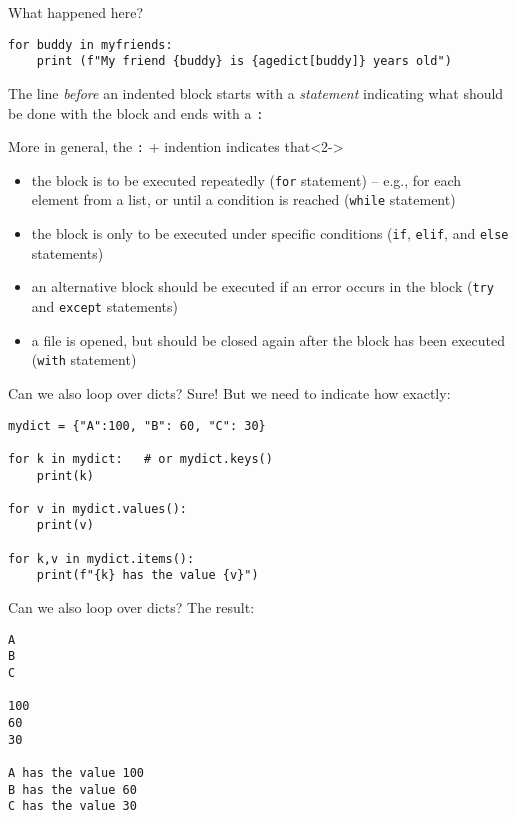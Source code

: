 \documentclass{beamer}
\begin{document}
\begin{frame}[fragile]{What happened here?}
\begin{lstlisting}
for buddy in myfriends:
    print (f"My friend {buddy} is {agedict[buddy]} years old")
\end{lstlisting}
\small
The line \emph{before} an indented block starts with a \emph{statement} indicating what should be done with the block and ends with a \texttt{:}

\footnotesize
\begin{block}{More in general, the \texttt{:} + indention indicates that}<2->
	\begin{itemize}
		\item<3-> the block is to be executed repeatedly (\texttt{for} statement) – e.g., for each element from a list, or until a condition is reached (\texttt{while} statement)
		\item<4-> the block is only to be executed under specific conditions (\texttt{if}, \texttt{elif}, and \texttt{else} statements)
		\item<5-> an alternative block should be executed if an error occurs in the block (\texttt{try} and \texttt{except} statements)
		\item<6-> a file is opened, but should be closed again after the block has been executed (\texttt{with} statement)
	\end{itemize}
\end{block}
\end{frame}



\begin{frame}[fragile]{Can we also loop over dicts?}
Sure! But we need to indicate how exactly:

\begin{lstlisting}
mydict = {"A":100, "B": 60, "C": 30}

for k in mydict:   # or mydict.keys()
    print(k)

for v in mydict.values():
    print(v)

for k,v in mydict.items():
    print(f"{k} has the value {v}")
\end{lstlisting}

\end{frame}




\begin{frame}[fragile]{Can we also loop over dicts?}
The result:

\begin{lstlisting}
A
B
C

100
60
30

A has the value 100
B has the value 60
C has the value 30
\end{lstlisting}

\end{frame}
\end{document}
